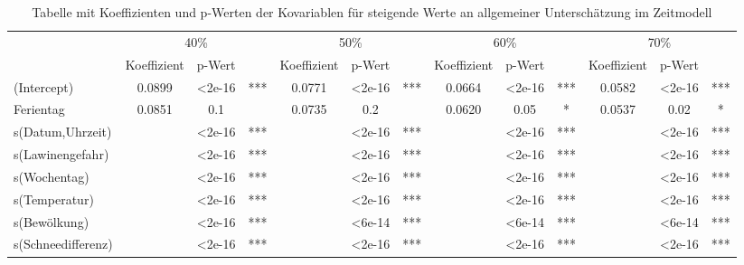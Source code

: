 \documentclass[12pt]{scrreprt}
\begin{document}
\begin{table}[htbp]
\begin{adjustbox}{max width=\textwidth}
\begin{tabular}{l|ccc|ccc|ccc|ccc|}
		\multicolumn{1}{r}{} & \multicolumn{3}{c}{40\%} & \multicolumn{3}{c}{50\%} & \multicolumn{3}{c}{60\%} & \multicolumn{3}{c}{70\%} \\
		& Koeffizient & p-Wert &       & Koeffizient & p-Wert &       & Koeffizient & p-Wert &       & Koeffizient & p-Wert & \multicolumn{1}{c}{} \\
		\cmidrule{2-13}    (Intercept) & 0.0899 & <2e-16 & ***   & 0.0771 & <2e-16 & ***   & 0.0664 & <2e-16 & ***   & 0.0582 & <2e-16 & *** \\
		Ferientag & 0.0851 & 0.1   &       & 0.0735 & 0.2   &       & 0.0620 & 0.05  & *     & 0.0537 & 0.02  & * \\
		s(Datum,Uhrzeit) &       & <2e-16 & ***   &       & <2e-16 & ***   &       & <2e-16 & ***   &       & <2e-16 & *** \\
		s(Lawinengefahr) &       & <2e-16 & ***   &       & <2e-16 & ***   &       & <2e-16 & ***   &       & <2e-16 & *** \\
		s(Wochentag) &       & <2e-16 & ***   &       & <2e-16 & ***   &       & <2e-16 & ***   &       & <2e-16 & *** \\
		s(Temperatur) &       & <2e-16 & ***   &       & <2e-16 & ***   &       & <2e-16 & ***   &       & <2e-16 & *** \\
		s(Bewölkung) &       & <2e-16 & ***   &       & <6e-14 & ***   &       & <6e-14 & ***   &       & <6e-14 & *** \\
		s(Schneedifferenz) &       & <2e-16 & ***   &       & <2e-16 & ***   &       & <2e-16 & ***   &       & <2e-16 & *** \\
		\cmidrule{2-13}    \end{tabular}%
	\end{adjustbox}
	\caption{Tabelle mit Koeffizienten und p-Werten der Kovariablen für steigende Werte an allgemeiner Unterschätzung im Zeitmodell}
	\label{tab:Szenario 1 im Zeitmodell}%
\end{table}%
\end{document}
